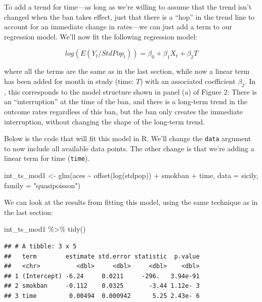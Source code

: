 \documentclass[
]{book}
\newenvironment{Shaded}{\begin{snugshade}}{\end{snugshade}}
\newcommand{\AttributeTok}[1]{\textcolor[rgb]{0.77,0.63,0.00}{#1}}
\newcommand{\FunctionTok}[1]{\textcolor[rgb]{0.00,0.00,0.00}{#1}}
\newcommand{\NormalTok}[1]{#1}
\newcommand{\OtherTok}[1]{\textcolor[rgb]{0.56,0.35,0.01}{#1}}
\newcommand{\SpecialCharTok}[1]{\textcolor[rgb]{0.00,0.00,0.00}{#1}}
\newcommand{\StringTok}[1]{\textcolor[rgb]{0.31,0.60,0.02}{#1}}
\begin{document}
To add a trend for time---as long as we're willing to assume that the trend isn't changed when the ban takes effect, just that there is a ``hop'' in the trend line to account for an immediate change in rates---we can just add a term to our regression model. We'll now fit the following regression model:

\[
log(E(Y_t/StdPop_t)) = \beta_0 + \beta_1 X_t + \beta_2 T
\]

where all the terms are the same as in the last section, while now a linear term has been added for month in study (time; \(T\)) with an associated coefficient \(\beta_2\). In \citet{bernal2017interrupted}, this corresponds to the model structure shown in panel (a) of Figure 2: There is an ``interruption'' at the time of the ban, and there is a long-term trend in the outcome rates regardless of this ban, but the ban only creates the immediate interruption, without changing the shape of the long-term trend.

Below is the code that will fit this model in R. We'll change the \texttt{data} argument to now include all available data points. The other change is that we're adding a linear term for time (\texttt{time}).

\begin{Shaded}
\begin{Highlighting}[]
\NormalTok{int\_ts\_mod1 }\OtherTok{\textless{}{-}} \FunctionTok{glm}\NormalTok{(aces }\SpecialCharTok{\textasciitilde{}} \FunctionTok{offset}\NormalTok{(}\FunctionTok{log}\NormalTok{(stdpop)) }\SpecialCharTok{+}\NormalTok{ smokban }\SpecialCharTok{+}\NormalTok{ time, }
                      \AttributeTok{data =}\NormalTok{ sicily, }
                      \AttributeTok{family =} \StringTok{"quasipoisson"}\NormalTok{)}
\end{Highlighting}
\end{Shaded}

We can look at the results from fitting this model, using the same technique as in the last section:

\begin{Shaded}
\begin{Highlighting}[]
\NormalTok{int\_ts\_mod1 }\SpecialCharTok{\%\textgreater{}\%} 
  \FunctionTok{tidy}\NormalTok{()}
\end{Highlighting}
\end{Shaded}

\begin{verbatim}
## # A tibble: 3 x 5
##   term        estimate std.error statistic  p.value
##   <chr>          <dbl>     <dbl>     <dbl>    <dbl>
## 1 (Intercept) -6.24     0.0211     -296.   3.94e-91
## 2 smokban     -0.112    0.0325       -3.44 1.12e- 3
## 3 time         0.00494  0.000942      5.25 2.43e- 6
\end{verbatim}
\end{document}
